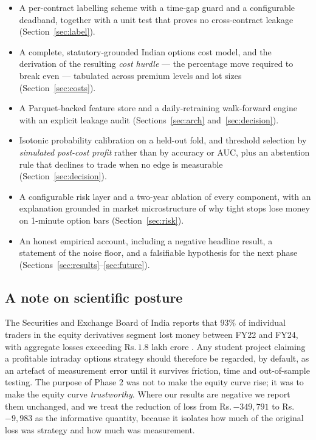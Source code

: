 \documentclass[11pt,a4paper]{article}
\newcommand{\rs}{Rs.\,}                 %
\begin{document}
\begin{itemize}
  \item A per-contract labelling scheme with a time-gap guard and a configurable
        deadband, together with a unit test that proves no cross-contract leakage
        (Section~\ref{sec:label}).
  \item A complete, statutory-grounded Indian options cost model, and the derivation of
        the resulting \emph{cost hurdle} --- the percentage move required to break even
        --- tabulated across premium levels and lot sizes (Section~\ref{sec:costs}).
  \item A Parquet-backed feature store and a daily-retraining walk-forward engine with
        an explicit leakage audit (Sections~\ref{sec:arch} and~\ref{sec:decision}).
  \item Isotonic probability calibration on a held-out fold, and threshold selection by
        \emph{simulated post-cost profit} rather than by accuracy or AUC, plus an
        abstention rule that declines to trade when no edge is measurable
        (Section~\ref{sec:decision}).
  \item A configurable risk layer and a two-year ablation of every component, with an
        explanation grounded in market microstructure of why tight stops lose money on
        1-minute option bars (Section~\ref{sec:risk}).
  \item An honest empirical account, including a negative headline result, a statement
        of the noise floor, and a falsifiable hypothesis for the next phase
        (Sections~\ref{sec:results}--\ref{sec:future}).
\end{itemize}

\subsection{A note on scientific posture}

The Securities and Exchange Board of India reports that $93\%$ of individual traders in
the equity derivatives segment lost money between FY22 and FY24, with aggregate losses
exceeding \rs$1.8$ lakh crore \cite{sebi}. Any student project claiming a profitable
intraday options strategy should therefore be regarded, by default, as an artefact of
measurement error until it survives friction, time and out-of-sample testing. The
purpose of Phase 2 was not to make the equity curve rise; it was to make the equity
curve \emph{trustworthy}. Where our results are negative we report them unchanged, and
we treat the reduction of loss from \rs$-349{,}791$ to \rs$-9{,}983$ as the informative
quantity, because it isolates how much of the original loss was strategy and how much
was measurement.
\end{document}
